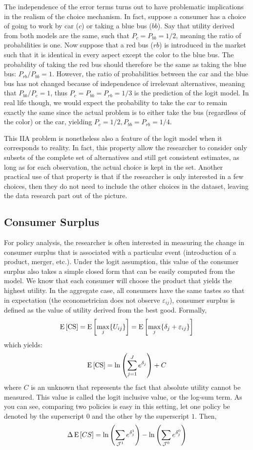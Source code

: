 The independence of the error terms turns out to have problematic implications in the realism of the choice mechanism. In fact, suppose a consumer has a choice of going to work by car ($c$) or taking a blue bus ($bb$). Say that utility derived from both models are the same, such that $P_c = P_{bb} = 1/2$, meaning the ratio of probabilities is one. Now suppose that a red bus ($rb$) is introduced in the market such that it is identical in every aspect except the color to the blue bus. The probability of taking the red bus should therefore be the same as taking the blue bus: $P_{rb}/P_{bb} = 1$. However, the ratio of probabilities between the car and the blue bus has not changed because of independence of irrelevant alternatives, meaning that $P_{bb}/P_{c} = 1$, thus $P_c = P_{bb} = P_{rb} = 1/3$ is the prediction of the logit model. In real life though, we would expect the probability to take the car to remain exactly the same since the actual problem is to either take the bus (regardless of the color) or the car, yielding $P_c = 1/2, P_{bb}=P_{rb} = 1/4 $.

This IIA problem is nonetheless also a feature of the logit model when it corresponds to reality. In fact, this property allow the researcher to consider only subsets of the complete set of alternatives and still get consistent estimates, as long as for each observation, the actual choice is kept in the set. Another practical use of that property is that if the researcher is only interested in a few choices, then they do not need to include the other choices in the dataset, leaving the data research part out of the picture.

\subsection{Consumer Surplus}

For policy analysis, the researcher is often interested in measuring the change in consumer surplus that is associated with a particular event (introduction of a product, merger, etc.). Under the logit assumption, this value of the consumer surplus also takes a simple closed form that can be easily computed from the model. We know that each consumer will choose the product that yields the highest utility. In the aggregate case, all consumers have the same tastes so that in expectation (the econometrician does not observe $\varepsilon_{ij}$), consumer surplus is defined as the value of utility derived from the best good. Formally, $$\operatorname{E}\left[\operatorname{CS}\right] = \operatorname{E}\left[\max_{j} \{U_{ij}\}\right] = \operatorname{E}\left[\max_{j} \{\delta_{j} + \varepsilon_{ij} \}\right]$$ which yields: $$\operatorname{E}\left[\operatorname{CS}\right] = \ln\left(\sum_{j=1}^{J} e^{\delta_j} \right) + C $$ where $C$ is an unknown that represents the fact that absolute utility cannot be measured. This value is called the logit inclusive value, or the log-sum term. As you can see, comparing two policies is easy in this setting, let one policy be denoted by the superscript $0$ and the other by the superscript $1$. Then, $$\Delta\operatorname{E}\left[CS\right] = \ln\left(\sum_{\mathcal{J}^1} e^{\delta_j^1} \right) - \ln\left(\sum_{\mathcal{J}^0} e^{\delta_j^0} \right) $$

